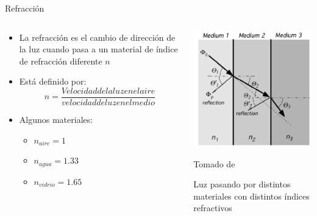 \documentclass[aspectratio=169]{beamer}
\begin{document}
\begin{frame}{Refracción}
    \begin{columns}[c, onlytextwidth]
        \begin{column}{0.55\textwidth}
            \begin{itemize}
                \item La refracción es el cambio de dirección de la luz cuando pasa a un material de índice de refracción diferente $n$
                \item Está definido por:\\
                \begin{equation*}
                     n=\frac{Velocidad de la luz en el aire}{velocidad de luz en el medio}
                \end{equation*}
               
                \item Algunos materiales: 
                \begin{itemize}
                    \item  $n_{aire}=1$
                    \item  $n_{agua}=1.33$
                    \item $n_{vidrio}=1.65$
                \end{itemize}
            \end{itemize}
        \end{column}
        \begin{column}{0.45\textwidth}
            \centering
            \includegraphics[width = 0.9\linewidth]{fig/Optica/Radiometry.PNG}
            
            \tiny{Tomado de \cite{Fraden_2016}}
            
            \tiny{Luz pasando por distintos materiales con distintos índices refractivos}
        \end{column}
    \end{columns}
\end{frame}
\end{document}
